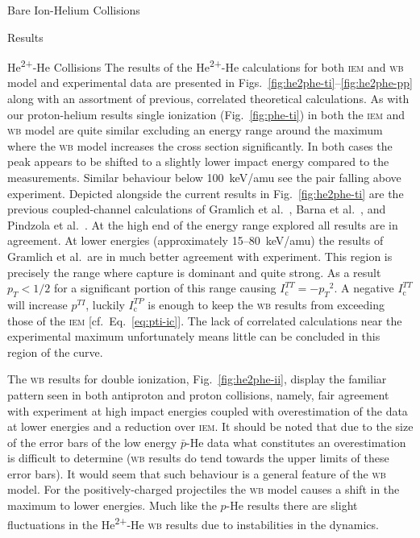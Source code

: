 \documentclass[a5paper, 9 pt]{extreport}
\begin{document}
\begin{chapter}{Bare Ion-Helium Collisions \label{chap:p-he2p-he}}
\begin{section}{Results \label{sec:phe2p-res}}
\begin{subsection}{\texorpdfstring{He\textsuperscript{2+}}{He2+}-He Collisions
                         \label{sec:he2phe-res}}
         The results of the He\textsuperscript{2+}-He calculations for both \textsc{iem} and \textsc{wb}
         model and experimental data are presented in Figs.~\ref{fig:he2phe-ti}--\ref{fig:he2phe-pp}
         along with an assortment of previous, correlated theoretical calculations. As with our
         proton-helium results single ionization (Fig.~\ref{fig:phe-ti}) in both the \textsc{iem} and
         \textsc{wb} model are quite similar excluding an energy range around the maximum where the
         \textsc{wb} model increases the cross section significantly. In both cases the peak appears to
         be shifted to a slightly lower impact energy compared to the measurements. Similar behaviour
         below 100~keV/amu see the pair falling above experiment. Depicted alongside the current results
         in Fig.~\ref{fig:he2phe-ti} are the previous coupled-channel calculations of Gramlich et
         al.~\cite{GGS-89}, Barna et al.~\cite{BTB-05}, and Pindzola et al.~\cite{PRC-07}. At the high
         end of the energy range explored all results are in agreement. At lower energies (approximately
         15--80~keV/amu) the results of Gramlich et al.\ are in much better agreement with experiment.
         This region is precisely the range where capture is dominant and quite strong. As a result
         $p_T < 1/2$ for a significant portion of this range causing $I^{TT}_\mathrm{c} = -{p_T}^2$. A
         negative $I^{TT}_\mathrm{c}$ will increase $p^{TI}$, luckily $I^{TP}_\mathrm{c}$ is enough to
         keep the \textsc{wb} results from exceeding those of the \textsc{iem} [cf.\
         Eq.~\eqref{eq:pti-ic}]. The lack of correlated calculations near the experimental maximum
         unfortunately means little can be concluded in this region of the curve.

         The \textsc{wb} results for double ionization, Fig.~\ref{fig:he2phe-ii}, display the familiar
         pattern seen in both antiproton and proton collisions, namely, fair agreement with experiment
         at high impact energies coupled with overestimation of the data at lower energies and a
         reduction over \textsc{iem}. It should be noted that due to the size of the error bars of the
         low energy $\bar{p}$-He data what constitutes an overestimation is difficult to determine
         (\textsc{wb} results do tend towards the upper limits of these error bars). It would seem that
         such behaviour is a general feature of the \textsc{wb} model. For the positively-charged
         projectiles the \textsc{wb} model causes a shift in the maximum to lower energies. Much like
         the $p$-He results there are slight fluctuations in the He\textsuperscript{2+}-He \textsc{wb}
         results due to instabilities in the dynamics.


\end{subsection}
\end{section}
\end{chapter}
\end{document}
